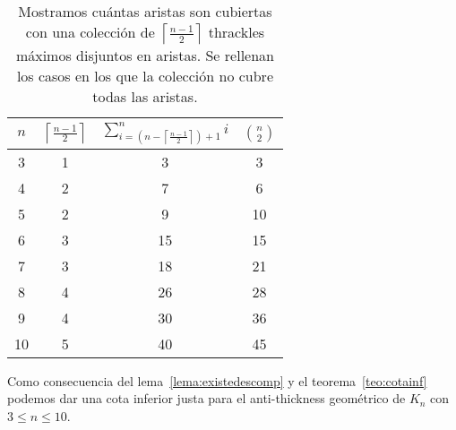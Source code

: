 \begin{table}[t]
  \centering
  \begin{tabular}{|c|c|c|c|}
    \hline
    $n$ & $\left\lceil\frac{n-1}{2}\right\rceil$ &
    $\sum^n_{i=\left(n-\left\lceil\frac{n-1}{2}\right\rceil\right) + 1}i$ &
    $\binom{n}{2}$\\[5pt] \hline\hline
    3   & 1  & 3 & 3 \\ \hline
    4   & 2  & 7 & 6 \\ \hline
    5   & 2  & \cellcolor{red!25}9 & 10 \\ \hline
    6   & 3  & 15 & 15 \\ \hline
    7   & 3  & \cellcolor{red!25}18 & 21 \\ \hline
    8   & 4  & \cellcolor{red!25}26 & 28 \\ \hline
    9   & 4  & \cellcolor{red!25}30 & 36 \\ \hline
    10  & 5  & \cellcolor{red!25}40 & 45 \\ \hline
  \end{tabular}
  \caption{ Mostramos cuántas aristas son cubiertas con una colección de
  $\left\lceil\frac{n-1}{2}\right\rceil$ thrackles máximos disjuntos en
  aristas. Se rellenan los casos en los que la colección no cubre todas las
  aristas. }
  \label{table:attrivialtight}
\end{table}

Como consecuencia del lema~\ref{lema:existedescomp} y el teorema~\ref{teo:cotainf} podemos dar una cota inferior justa para el anti-thickness geométrico de $K_n$ con $3 \leq n \leq 10$.

